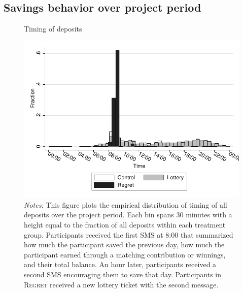 \documentclass[11pt]{article}
\begin{document}
	\subsection{Savings behavior over project period}

        \begin{figure}[ht]
        \centering
        \caption{Timing of deposits}
        \includegraphics[width=\textwidth]{../../figures/hist-deposits.pdf}
        \caption*{\footnotesize \emph{Notes:} This figure plots the empirical distribution of timing of all deposits over the project period. Each bin spans 30 minutes with a height equal to the fraction of all deposits within each treatment group. Participants received the first SMS at 8:00 that summarized how much the participant saved the previous day, how much the participant earned through a matching contribution or winnings, and their total balance. An hour later, participants received a second SMS encouraging them to save that day. Participants in \textsc{Regret} received a new lottery ticket with the second message.}
        \end{figure}
\end{document}
